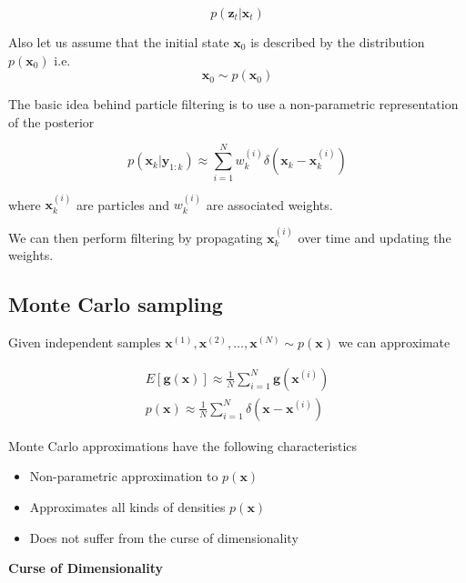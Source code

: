 \begin{equation}
p(\mathbf{z}_t | \mathbf{x}_{t}) 
\label{pf_measurement_model}
\end{equation}

Also let us assume that the  initial state $\mathbf{x}_0$ is described by the distribution $p(\mathbf{x}_0)$ i.e.
\begin{equation}
\mathbf{x}_0 \sim p(\mathbf{x}_0)
\end{equation}

The basic idea behind particle filtering is to use a non-parametric representation of the posterior

\begin{equation}
p(\mathbf{x}_k | \mathbf{y}_{1:k}) \approx \sum_{i=1}^N w_{k}^{(i)} \delta (\mathbf{x}_k -\mathbf{x}_{k}^{(i)})
\end{equation}

where $\mathbf{x}_{k}^{(i)}$ are particles and $w_{k}^{(i)}$ are associated weights.

We can then perform filtering by propagating $\mathbf{x}_{k}^{(i)}$ over time and
updating the weights.


\subsection{Monte Carlo sampling}
\label{monte_carlo_sampling}

Given independent samples $\mathbf{x}^{(1)}, \mathbf{x}^{(2)}, \ldots, \mathbf{x}^{(N)} \sim p(\mathbf{x})$ we can approximate

\begin{eqnarray}
E[\mathbf{g}(\mathbf{x})] \approx \frac{1}{N}\sum_{i=1}^N \mathbf{g}(\mathbf{x}^{(i)}) \\
p(\mathbf{x}) \approx \frac{1}{N}\sum_{i=1}^N \delta(\mathbf{x} - \mathbf{x}^{(i)})
\end{eqnarray}

Monte Carlo approximations have the following characteristics

\begin{itemize}
\item Non-parametric approximation to $p(\mathbf{x})$
\item Approximates all kinds of densities $p(\mathbf{x})$
\item Does not suffer from the curse of dimensionality
\end{itemize}

\begin{framed}
\theoremstyle{remark}
\begin{remark}{\textbf{Curse of Dimensionality}}

\end{remark}
\end{framed}

